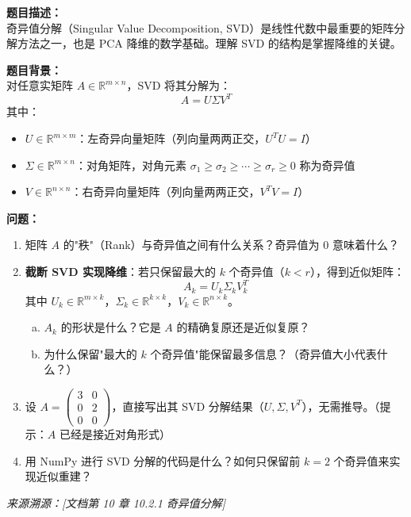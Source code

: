\documentclass[a4paper,11pt]{ctexart}
\begin{document}
\begin{problembox}
    \textbf{题目描述：}\\
    奇异值分解（Singular Value Decomposition, SVD）是线性代数中最重要的矩阵分解方法之一，也是 PCA 降维的数学基础。理解 SVD 的结构是掌握降维的关键。

    \vspace{0.3cm}
    \textbf{题目背景：}\\
    对任意实矩阵 $A \in \mathbb{R}^{m \times n}$，SVD 将其分解为：
    \[
    A = U \Sigma V^T
    \]
    其中：
    \begin{itemize}
        \item $U \in \mathbb{R}^{m \times m}$：左奇异向量矩阵（列向量两两正交，$U^T U = I$）
        \item $\Sigma \in \mathbb{R}^{m \times n}$：对角矩阵，对角元素 $\sigma_1 \geq \sigma_2 \geq \cdots \geq \sigma_r \geq 0$ 称为奇异值
        \item $V \in \mathbb{R}^{n \times n}$：右奇异向量矩阵（列向量两两正交，$V^T V = I$）
    \end{itemize}

    \textbf{问题：}
    \begin{enumerate}[(1)]
        \item 矩阵 $A$ 的"秩"（Rank）与奇异值之间有什么关系？奇异值为 0 意味着什么？

        \item \textbf{截断 SVD 实现降维}：若只保留最大的 $k$ 个奇异值（$k < r$），得到近似矩阵：
        \[
        A_k = U_k \Sigma_k V_k^T
        \]
        其中 $U_k \in \mathbb{R}^{m \times k}$，$\Sigma_k \in \mathbb{R}^{k \times k}$，$V_k \in \mathbb{R}^{n \times k}$。

        \begin{enumerate}[a.]
            \item $A_k$ 的形状是什么？它是 $A$ 的精确复原还是近似复原？
            \item 为什么保留"最大的 $k$ 个奇异值"能保留最多信息？（奇异值大小代表什么？）
        \end{enumerate}

        \item 设 $A = \begin{pmatrix} 3 & 0 \\ 0 & 2 \\ 0 & 0 \end{pmatrix}$，直接写出其 SVD 分解结果（$U, \Sigma, V^T$），无需推导。（提示：$A$ 已经是接近对角形式）

        \item 用 NumPy 进行 SVD 分解的代码是什么？如何只保留前 $k=2$ 个奇异值来实现近似重建？
    \end{enumerate}

    \vspace{0.2cm}
    {\color{gray}\small\textit{来源溯源：[文档第 10 章 10.2.1 奇异值分解]}}
\end{problembox}
\end{document}
